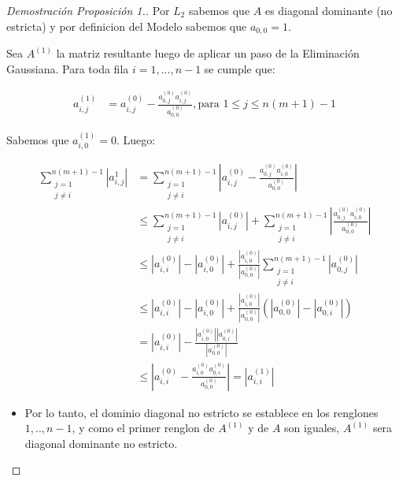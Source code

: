 \begin{proof}[Demostración Proposición 1.]

Por $L_{2}$ sabemos que $A$ es diagonal dominante (no estricta) y por definicion del Modelo sabemos que $a_{0,0} = 1$.

Sea $A^{(1)}$ la matriz resultante luego de aplicar un paso de la Eliminación Gaussiana. Para toda fila $i = 1,...,n-1$ se cumple que:

\begin{equation*}
    \begin{aligned}
      a^{(1)}_{i,j} &= a^{(0)}_{i,j} - \frac{a^{(0)}_{0,j}a^{(0)}_{i,j}}{a^{(0)}_{0,0}}, \text{para } 1 \leq j \leq n(m+1)-1
    \end{aligned}
\end{equation*}

Sabemos que $a^{(1)}_{i,0} = 0$. Luego:

\begin{equation*}
    \begin{aligned}
      \sum\limits_{\substack{j=1  \\ j \neq i}}^{n(m+1)-1} |a^{1}_{i,j}| &= \sum\limits_{\substack{j=1  \\ j \neq i}}^{n(m+1)-1} |a^{(0)}_{i,j} - \frac{a^{(0)}_{0,j}a^{(0)}_{i,0}}{a^{(0)}_{0,0}}| \\
      &\leq \sum\limits_{\substack{j=1  \\ j \neq i}}^{n(m+1)-1} |a^{(0)}_{i,j}| + \sum\limits_{\substack{j=1  \\ j \neq i}}^{n(m+1)-1} |\frac{a^{(0)}_{0,j}a^{(0)}_{i,0}}{a^{(0)}_{0,0}}| \\
      &\leq |a^{(0)}_{i,i}| - |a^{(0)}_{i,0}| +  \frac{|a^{(0)}_{i,0}|}{|a^{(0)}_{0,0}|} \sum\limits_{\substack{j=1  \\ j \neq i}}^{n(m+1)-1} |a^{(0)}_{0,j}| \\
      &\leq |a^{(0)}_{i,i}| - |a^{(0)}_{i,0}| +  \frac{|a^{(0)}_{i,0}|}{|a^{(0)}_{0,0}|} (|a^{(0)}_{0,0}| - |a^{(0)}_{0,i}|) \\
      &= |a^{(0)}_{i,i}| - \frac{|a^{(0)}_{i,0}||a^{(0)}_{0,i}|}{|a^{(0)}_{0,0}|} \\
      &\leq |a^{(0)}_{i,i} - \frac{a^{(0)}_{i,0}a^{(0)}_{0,i}}{a^{(0)}_{0,0}}| = |a^{(1)}_{i,i}|
    \end{aligned}
\end{equation*}

\begin{itemize}


\item Por lo tanto, el dominio diagonal no estricto se establece en los renglones $1,..,n-1$, y como el primer renglon de $A^{(1)}$ y de $A$ son iguales,
$A^{(1)}$ sera diagonal dominante no estricto.


\end{itemize}
\end{proof}

